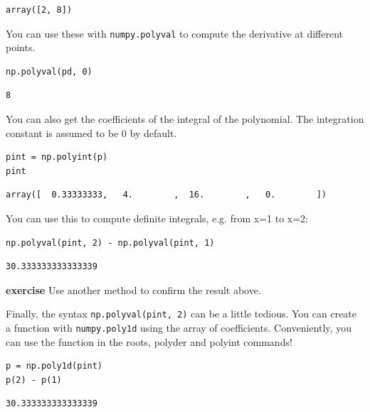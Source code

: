 \documentclass[11pt]{article}
\begin{document}
\begin{verbatim}
array([2, 8])
\end{verbatim}

You can use these with \texttt{numpy.polyval} to compute the derivative at different points.

\begin{verbatim}
np.polyval(pd, 0)
\end{verbatim}

\begin{verbatim}
8
\end{verbatim}

You can also get the coefficients of the integral of the polynomial. The integration constant is assumed to be 0 by default.

\begin{verbatim}
pint = np.polyint(p)
pint
\end{verbatim}

\begin{verbatim}
array([  0.33333333,   4.        ,  16.        ,   0.        ])
\end{verbatim}

You can use this to compute definite integrals, e.g. from x=1 to x=2:

\begin{verbatim}
np.polyval(pint, 2) - np.polyval(pint, 1)
\end{verbatim}

\begin{verbatim}
30.333333333333339
\end{verbatim}

\textbf{exercise} Use another method to confirm the result above.

Finally, the syntax \texttt{np.polyval(pint, 2)} can be a little tedious. You can create a function with \texttt{numpy.poly1d} using the array of coefficients. Conveniently, you can use the function in the roots, polyder and polyint commands!

\begin{verbatim}
p = np.poly1d(pint)
p(2) - p(1)
\end{verbatim}

\begin{verbatim}
30.333333333333339
\end{verbatim}
\end{document}
